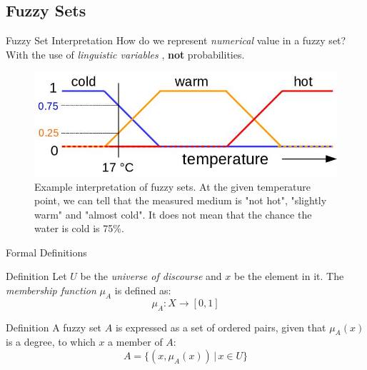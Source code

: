 \documentclass[hyperref={unicode}]{beamer}
\begin{document}
\subsection{Fuzzy Sets}


\begin{frame}{Fuzzy Set Interpretation}
	How do we represent \textit{numerical} value in a fuzzy set? With the use of \textit{linguistic variables} \cite{lieb1993linguistic}, \textbf{not} probabilities.
	\begin{figure}
		\includegraphics[width=.75\textwidth]{fuzzy-set-degrees.jpg}
		\caption{Example interpretation of fuzzy sets. At the given temperature point, we can tell that the measured medium is "not hot", "slightly warm" and "almost cold". It does not mean that the chance the water is cold is 75\%.
		\label{fig:fuzzy-set}}
	\end{figure}
\end{frame}

\begin{frame}{Formal Definitions}
	\begin{block}{Definition}
		Let $U$ be the \textit{universe of discourse} and $x$ be the element in it. The \textit{membership function} $\mu_A$ is defined as:
		$$\mu_A:X\rightarrow[0,1]$$
	\end{block}
	\begin{block}{Definition}
		A fuzzy set $A$ is expressed as a set of ordered pairs, given that $\mu_A(x)$ is a degree, to which $x$ a member of $A$:
	$$A=\{(x,\mu_A(x))\,|\,x \in U\}$$
	\end{block}
\end{frame}
\end{document}
